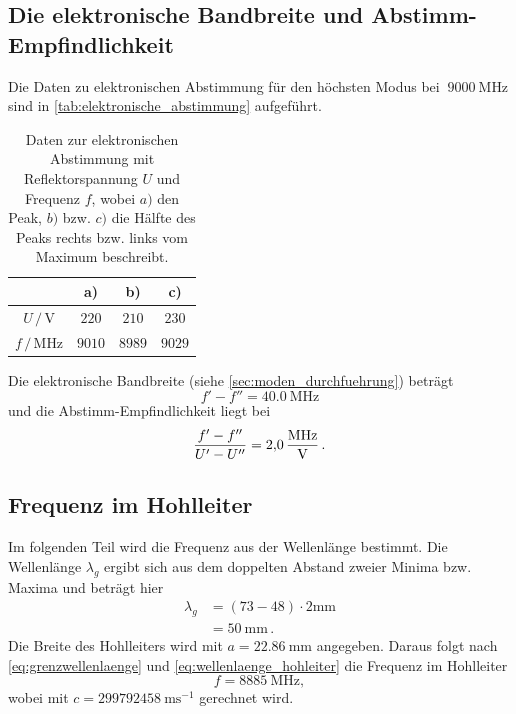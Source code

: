 \subsection{Die elektronische Bandbreite und Abstimm-Empfindlichkeit}
Die Daten zu elektronischen Abstimmung für den höchsten Modus bei $~\SI{9000}{\mega\hertz}$ sind in \autoref{tab:elektronische_abstimmung} aufgeführt.
\begin{table}
    \centering
    \caption{Daten zur elektronischen Abstimmung mit Reflektorspannung $U$ und Frequenz $f$, wobei $a)$ den Peak, $b)$ bzw. $c)$ die Hälfte des Peaks rechts bzw. links vom Maximum beschreibt.}
    \begin{tabular}{c c c c}
        \toprule
        & a) & b) & c) \\
        \midrule
        $U \,/\, \si{\volt}$ & $220$ & $210$ & $230$ \\
        $f \,/\, \si{\mega\hertz}$ & $9010$ & $8989$ & $9029$ \\
    \end{tabular}
    \label{tab:elektronische_abstimmung}
\end{table}
Die elektronische Bandbreite (siehe \autoref{sec:moden_durchfuehrung}) beträgt
\begin{equation*}
    f' - f'' = \SI{40.0}{\mega\hertz}
\end{equation*}
und die Abstimm-Empfindlichkeit liegt bei
\begin{equation*}
    \frac{f' - f''}{U' - U''} = \SI{2.0}{\frac{\mega\hertz}{\volt}} \, .
\end{equation*}
\FloatBarrier

\subsection{Frequenz im Hohlleiter}
\label{sec:ausw_frequenz}
Im folgenden Teil wird die Frequenz aus der Wellenlänge bestimmt.
Die Wellenlänge $\lambda_g$ ergibt sich aus dem doppelten Abstand zweier Minima bzw. Maxima und beträgt hier
\begin{align*}
    \lambda_g &= (73 - 48) \cdot 2 \si{\milli \metre} \\
    &= \SI{50}{\milli \metre} \, .
\end{align*}
Die Breite des Hohlleiters wird mit $a = \SI{22.86}{\milli \metre}$ angegeben.
Daraus folgt nach \autoref{eq:grenzwellenlaenge} und \autoref{eq:wellenlaenge_hohleiter} die Frequenz im Hohlleiter
\begin{equation*}
    f = \SI{8885}{\mega\hertz},
\end{equation*}
wobei mit $c = \SI{299792458}{\meter\second^{-1}}$ gerechnet wird.
\FloatBarrier

